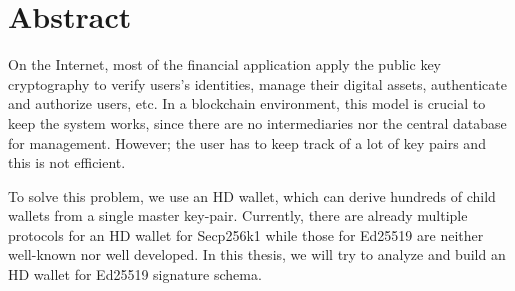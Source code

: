\chapter*{Abstract}
\thispagestyle{fancy}
\label{abstract}
\hspace*{5cm}

On the Internet, most of the financial application apply the public key cryptography to verify users's identities, manage their digital assets, authenticate and authorize users, etc. In a blockchain environment, this model is crucial to keep the system works, since there are no intermediaries nor the central database for management. However; the user has to keep track of a lot of key pairs and this is not efficient.

To solve this problem, we use an HD wallet, which can derive hundreds of child wallets from a single master key-pair. Currently, there are already multiple protocols for an HD wallet for Secp256k1 while those for Ed25519 are neither well-known nor well developed. In this thesis, we will try to analyze and build an HD wallet for Ed25519 signature schema.

\cleardoublepage